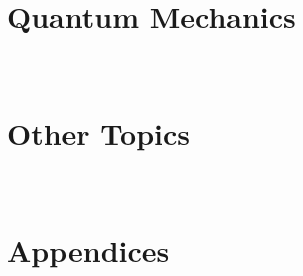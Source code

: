 \documentclass[english,twoside]{labmanual} %
\begin{document}
\part{Quantum Mechanics}
\
	
	
	
	

\part{Other Topics}
\
	
	
	
	
	

\part{Appendices}
\
\appendix




	 
	
	
	
\end{document}

